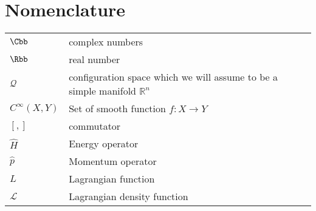 \chapter*{Nomenclature}

\begin{flushleft}
\begin{longtable}[l]{ll} %
    $\Cbb$ & complex numbers \\[1mm]
    $\Rbb$ & real number \\[1mm]
    $\mathcal{Q}$ & configuration space which we will assume to be a simple manifold $\mathbb{R}^{n}$ \\[1mm]
    $C^{\infty}(X, Y)$ & Set of smooth function $f: X \to Y$ \\[1mm]
    $[,]$ & commutator \\[1mm]
    $\hat{H}$ & Energy operator \\[1mm]
    $\hat{p}$ & Momentum operator \\[1mm]
    $L$ & Lagrangian function \\[1mm]
    $\mathcal{L}$ & Lagrangian density function \\[1mm]
\end{longtable}
\end{flushleft}
